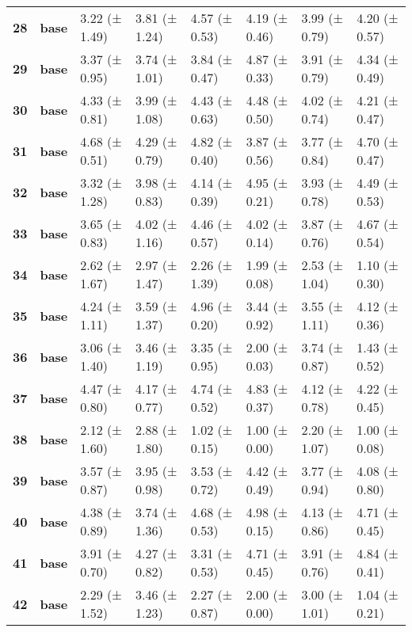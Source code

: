 \begin{longtable}{llllllll}
\cline{1-8}
\textbf{28} & \textbf{base} & 3.22 (± 1.49) & 3.81 (± 1.24) & 4.57 (± 0.53) & 4.19 (± 0.46) & 3.99 (± 0.79) & 4.20 (± 0.57) \\
\cline{1-8}
\textbf{29} & \textbf{base} & 3.37 (± 0.95) & 3.74 (± 1.01) & 3.84 (± 0.47) & 4.87 (± 0.33) & 3.91 (± 0.79) & 4.34 (± 0.49) \\
\cline{1-8}
\textbf{30} & \textbf{base} & 4.33 (± 0.81) & 3.99 (± 1.08) & 4.43 (± 0.63) & 4.48 (± 0.50) & 4.02 (± 0.74) & 4.21 (± 0.47) \\
\cline{1-8}
\textbf{31} & \textbf{base} & 4.68 (± 0.51) & 4.29 (± 0.79) & 4.82 (± 0.40) & 3.87 (± 0.56) & 3.77 (± 0.84) & 4.70 (± 0.47) \\
\cline{1-8}
\textbf{32} & \textbf{base} & 3.32 (± 1.28) & 3.98 (± 0.83) & 4.14 (± 0.39) & 4.95 (± 0.21) & 3.93 (± 0.78) & 4.49 (± 0.53) \\
\cline{1-8}
\textbf{33} & \textbf{base} & 3.65 (± 0.83) & 4.02 (± 1.16) & 4.46 (± 0.57) & 4.02 (± 0.14) & 3.87 (± 0.76) & 4.67 (± 0.54) \\
\cline{1-8}
\textbf{34} & \textbf{base} & 2.62 (± 1.67) & 2.97 (± 1.47) & 2.26 (± 1.39) & 1.99 (± 0.08) & 2.53 (± 1.04) & 1.10 (± 0.30) \\
\cline{1-8}
\textbf{35} & \textbf{base} & 4.24 (± 1.11) & 3.59 (± 1.37) & 4.96 (± 0.20) & 3.44 (± 0.92) & 3.55 (± 1.11) & 4.12 (± 0.36) \\
\cline{1-8}
\textbf{36} & \textbf{base} & 3.06 (± 1.40) & 3.46 (± 1.19) & 3.35 (± 0.95) & 2.00 (± 0.03) & 3.74 (± 0.87) & 1.43 (± 0.52) \\
\cline{1-8}
\textbf{37} & \textbf{base} & 4.47 (± 0.80) & 4.17 (± 0.77) & 4.74 (± 0.52) & 4.83 (± 0.37) & 4.12 (± 0.78) & 4.22 (± 0.45) \\
\cline{1-8}
\textbf{38} & \textbf{base} & 2.12 (± 1.60) & 2.88 (± 1.80) & 1.02 (± 0.15) & 1.00 (± 0.00) & 2.20 (± 1.07) & 1.00 (± 0.08) \\
\cline{1-8}
\textbf{39} & \textbf{base} & 3.57 (± 0.87) & 3.95 (± 0.98) & 3.53 (± 0.72) & 4.42 (± 0.49) & 3.77 (± 0.94) & 4.08 (± 0.80) \\
\cline{1-8}
\textbf{40} & \textbf{base} & 4.38 (± 0.89) & 3.74 (± 1.36) & 4.68 (± 0.53) & 4.98 (± 0.15) & 4.13 (± 0.86) & 4.71 (± 0.45) \\
\cline{1-8}
\textbf{41} & \textbf{base} & 3.91 (± 0.70) & 4.27 (± 0.82) & 3.31 (± 0.53) & 4.71 (± 0.45) & 3.91 (± 0.76) & 4.84 (± 0.41) \\
\cline{1-8}
\textbf{42} & \textbf{base} & 2.29 (± 1.52) & 3.46 (± 1.23) & 2.27 (± 0.87) & 2.00 (± 0.00) & 3.00 (± 1.01) & 1.04 (± 0.21) \\

\end{longtable}
